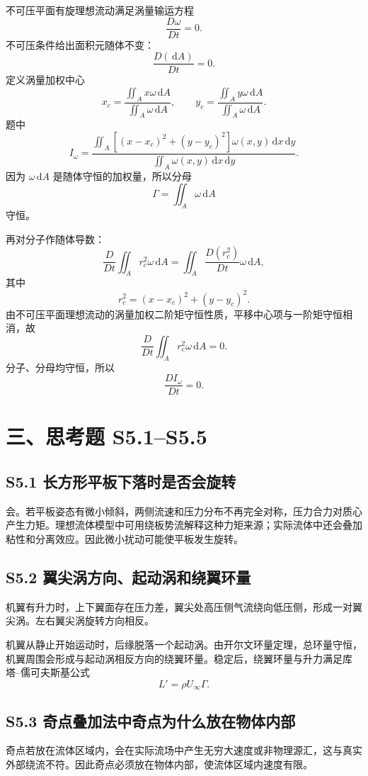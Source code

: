 ﻿\documentclass[UTF8,zihao=-4]{ctexart}
\newcommand{\dd}{\,\mathrm d}
\begin{document}
不可压平面有旋理想流动满足涡量输运方程
\[
\frac{D\omega}{Dt}=0.
\]
不可压条件给出面积元随体不变：
\[
\frac{D(\dd A)}{Dt}=0.
\]
定义涡量加权中心
\[
x_c=\frac{\iint_A x\omega\dd A}{\iint_A\omega\dd A},
\qquad
y_c=\frac{\iint_A y\omega\dd A}{\iint_A\omega\dd A}.
\]
题中
\[
I_\omega=
\frac{
\iint_A[(x-x_c)^2+(y-y_c)^2]\omega(x,y)\dd x\dd y}
{\iint_A\omega(x,y)\dd x\dd y}.
\]
因为 \(\omega\dd A\) 是随体守恒的加权量，所以分母
\[
\Gamma=\iint_A\omega\dd A
\]
守恒。

再对分子作随体导数：
\[
\frac{D}{Dt}\iint_A r_c^2\omega\dd A
=\iint_A \frac{D(r_c^2)}{Dt}\omega\dd A,
\]
其中
\[
r_c^2=(x-x_c)^2+(y-y_c)^2.
\]
由不可压平面理想流动的涡量加权二阶矩守恒性质，平移中心项与一阶矩守恒相消，故
\[
\frac{D}{Dt}\iint_A r_c^2\omega\dd A=0.
\]
分子、分母均守恒，所以
\[
\boxed{\frac{DI_\omega}{Dt}=0.}
\]

\section*{三、思考题 S5.1--S5.5}

\subsection*{S5.1 长方形平板下落时是否会旋转}

会。若平板姿态有微小倾斜，两侧流速和压力分布不再完全对称，压力合力对质心产生力矩。理想流体模型中可用绕板势流解释这种力矩来源；实际流体中还会叠加粘性和分离效应。因此微小扰动可能使平板发生旋转。

\subsection*{S5.2 翼尖涡方向、起动涡和绕翼环量}

机翼有升力时，上下翼面存在压力差，翼尖处高压侧气流绕向低压侧，形成一对翼尖涡。左右翼尖涡旋转方向相反。

机翼从静止开始运动时，后缘脱落一个起动涡。由开尔文环量定理，总环量守恒，机翼周围会形成与起动涡相反方向的绕翼环量。稳定后，绕翼环量与升力满足库塔--儒可夫斯基公式
\[
L'=\rho U_\infty \Gamma .
\]

\subsection*{S5.3 奇点叠加法中奇点为什么放在物体内部}

奇点若放在流体区域内，会在实际流场中产生无穷大速度或非物理源汇，这与真实外部绕流不符。因此奇点必须放在物体内部，使流体区域内速度有限。
\end{document}
